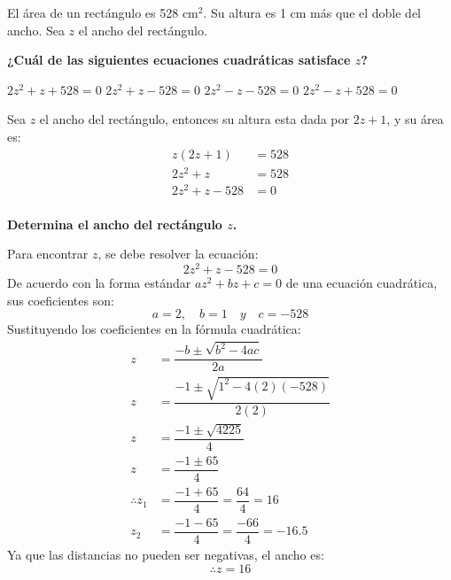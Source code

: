 El área de un rectángulo es 528 cm$^2$. Su altura es 1 cm más que el doble del ancho. Sea $z$ el ancho del rectángulo.

\begin{subparts}
    \subpart \textbf{¿Cuál de las siguientes ecuaciones cuadráticas satisface $z$?}

    \begin{oneparchoices}
        \choice $2z^2+z+528=0$
        \CorrectChoice $2z^2+z-528=0$
        \choice $2z^2-z-528=0$
        \choice $2z^2-z+528=0$
    \end{oneparchoices}

    \begin{solutionbox}{4cm}
        Sea $z$ el ancho del rectángulo, entonces su altura esta dada por $2z+1$, y su área es:
        \begin{align*}
            z(2z+1)    & =528 \\
            2z^2+z     & =528 \\
            2z^2+z-528 & =0   \\
        \end{align*}
    \end{solutionbox}

    \subpart \textbf{Determina el ancho del rectángulo $z$.}

    \begin{solutionbox}{13.8cm}
        Para encontrar $z$, se debe resolver la ecuación:
        \[ 2z^2+z-528  =0 \]
        De acuerdo con la forma estándar $az^2 + bz + c = 0$ de una ecuación cuadrática, sus coeficientes son:
        \[            a=2, \quad b=1 \quad y \quad c=-528\]
        Sustituyendo los coeficientes en la fórmula
        cuadrática:
        \begin{align*}
            z              & = \dfrac{-b\pm\sqrt{b^2-4ac}}{2a}          \\[1.2em]
            z              & = \dfrac{-1\pm\sqrt{1^2-4(2)(-528)}}{2(2)} \\[1.2em]
            z              & = \dfrac{-1\pm\sqrt{4225}}{4}              \\[1.2em]
            z              & = \dfrac{-1\pm 65}{4}                      \\[1.2em]
            \therefore z_1 & = \dfrac{-1+65}{4}=\dfrac{64}{4}=16        \\[1.2em]
            z_2            & = \dfrac{-1-65}{4}=\dfrac{-66}{4}=-16.5
        \end{align*}
        Ya que las distancias no pueden ser negativas, el ancho es:
        \[\therefore z=16\]
    \end{solutionbox}
\end{subparts}
